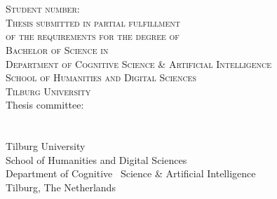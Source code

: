 \thispagestyle{empty}

\begin{center}
\huge{\textbf{\thesistitle{}}} \\[1.2cm]
\normalsize{\yourname{}} \\
\normalsize{\textsc{Student number}: \yourstudentnumber{}} \\ [1cm]
\normalsize{\textsc{Thesis submitted in partial fulfillment}} \\
\normalsize{\textsc{of the requirements for the degree of}} \\
\normalsize{\textsc{Bachelor of Science in \yourprogramme{}}}\\
\normalsize{\textsc{Department of Cognitive Science \& Artificial Intelligence}} \\
\normalsize{\textsc{School of Humanities and Digital Sciences}} \\
\normalsize{\textsc{Tilburg University}} \\ [1.5cm]
\normalsize{Thesis committee:} \\[0.2cm]
\normalsize{\supervisor{}} \\
\normalsize{\committee{}} \\
\vfill
\normalsize{Tilburg University} \\
\normalsize{School of Humanities and Digital Sciences} \\
\normalsize{Department of Cognitive \ Science \& Artificial Intelligence} \\
\normalsize{Tilburg, The Netherlands} \\
\normalsize{\finalmonth{} \finalyear{}} \\
\end{center}

\newpage \thispagestyle{empty} \strut
\newpage \thispagestyle{empty}